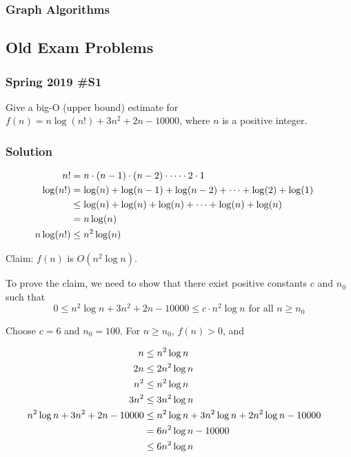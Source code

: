 \subsubsection{Graph Algorithms}


\subsection{Old Exam Problems}

\subsubsection{Spring 2019 \#S1}

	Give a big-O (upper bound) estimate for $f(n) = n \log(n!) + 3n^2 + 2n - 10000$, where $n$ is a positive integer.
	
\subsubsection{Solution}

\begin{align*}
	n! &= n \cdot (n-1) \cdot (n-2) \cdot \cdots \cdot 2 \cdot 1 \cr
	\log(n!) &= \log(n) + \log(n-1) + \log(n-2) + \cdots + \log(2) + \log(1) \cr
	 	&\le \log(n) + \log(n) + \log(n) + \cdots + \log(n) + \log(n) \cr
		&= n \log(n) \cr
	n \log(n!) &\le n^2 \log(n) \cr
\end{align*}

Claim:  $f(n)$ is $O(n^2 \log n)$.  

To prove the claim, we need to show that there exist positive constants $c$ and $n_0$ such that 
$$0 \le n^2 \log n + 3n^2 + 2n - 10000 \le c \cdot n^2 \log n \text{ for all } n \ge n_0$$

Choose $c=6$ and $n_0 = 100$.  For $n \ge n_0$, $f(n)>0$, and

\begin{align*}
	n &\le n^2 \log n \cr
	2n &\le 2n^2 \log n \cr
	n^2 &\le n^2 \log n \cr
	3n^2 &\le 3n^2 \log n \cr
	n^2 \log n + 3n^2 + 2n - 10000 &\le n^2 \log n + 3n^2 \log n + 2n^2 \log n - 10000 \cr
		&= 6n^2 \log n	- 10000 \cr
		&\le 6n^2 \log n \cr
\end{align*}

